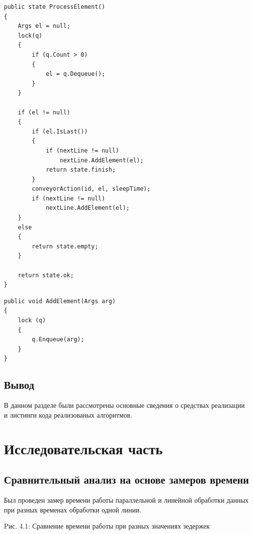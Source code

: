 \documentclass[12pt]{report}
\begin{document}
\newpage
\begin{lstlisting}[label=some-code,caption=Обработка элемента]
public state ProcessElement()
{
    Args el = null;
    lock(q)
    {
        if (q.Count > 0)
        {
            el = q.Dequeue();
        }
    }
    
    if (el != null)
    {
        if (el.IsLast())
        {
            if (nextLine != null)
                nextLine.AddElement(el);
            return state.finish;
        }
        conveyorAction(id, el, sleepTime);
        if (nextLine != null)
            nextLine.AddElement(el);
    }
    else
    {
        return state.empty;
    }

    return state.ok;
}
\end{lstlisting}


\begin{lstlisting}[label=some-code,caption=Добавление элемента в очередь]
public void AddElement(Args arg)
{
    lock (q)
    {
        q.Enqueue(arg);
    }
}
\end{lstlisting}
\captionsetup{singlelinecheck = false, justification=centering}

\section*{Вывод}
В данном разделе были рассмотрены основные сведения о средствах реализации и листинги кода реализованых алгоритмов.

\newpage
\chapter{Исследовательская часть}

\section{Сравнительный анализ на основе замеров времени}

Был проведен замер времени работы параллельной и линейной обработки данных при разных временах обработки одной линии.
 
\begin{center}

Pис. 4.1: Сравнение времени работы при разных значениях зедержек
\end{center}
\end{document}
